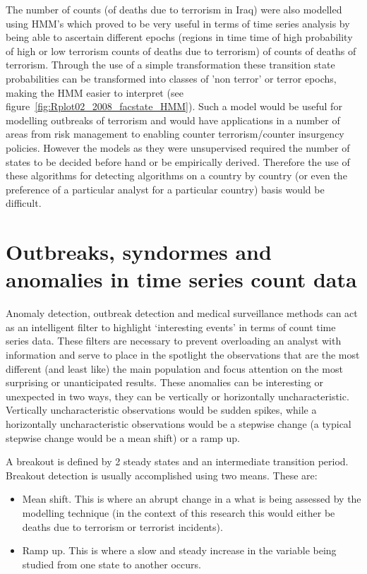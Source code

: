 The number of counts (of deaths due to terrorism in Iraq) were also modelled using HMM's which proved to be very useful in terms of time series analysis by being able to ascertain different epochs (regions in time time of high probability of high or low terrorism counts of deaths due to terrorism) of counts of deaths of terrorism. Through the use of a simple transformation these transition state probabilities can be transformed into classes of 'non terror' or terror epochs, making the HMM easier to interpret (see figure~\ref{fig:Rplot02_2008_facstate_HMM}). Such a model would be useful for modelling outbreaks of terrorism and would have applications in a number of areas from risk management to enabling counter terrorism/counter insurgency policies. However the models as they were unsupervised required the number of states to be decided before hand or be empirically derived. Therefore the use of these algorithms for detecting algorithms on a country by country (or even the preference of a particular analyst for a particular country) basis would be difficult.

\section{Outbreaks, syndormes and anomalies in  time series count data} 

Anomaly detection, outbreak detection and medical surveillance methods can act as an intelligent filter to highlight ‘interesting events’ in terms of count time series data. These filters are necessary to prevent overloading an analyst with information and serve to place in the spotlight the observations that are the most different (and least like) the main population and focus attention on the most surprising or unanticipated results. These anomalies can be interesting or unexpected in two ways, they can be vertically or horizontally uncharacteristic. Vertically uncharacteristic observations would be sudden spikes, while a horizontally uncharacteristic observations would be a stepwise change (a typical stepwise change would be a mean shift) or a ramp up.

A breakout is defined by 2 steady states and an intermediate transition period. Breakout detection is usually accomplished using two means. These are:
\begin{itemize}
\item Mean shift. This is where an abrupt change in a what is being assessed by the modelling technique (in the context of this research this would either be deaths due to terrorism or terrorist incidents). 
\item Ramp up. This is where a slow and steady increase in the variable being studied from one state to another occurs.
\end{itemize}

